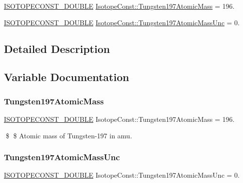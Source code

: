 \begin{DoxyCompactItemize}
\item 
\mbox{\hyperlink{group___isotope_const-_macros_ga8f45a7272ce02c0b4c65c44636ed719a}{I\+S\+O\+T\+O\+P\+E\+C\+O\+N\+S\+T\+\_\+\+D\+O\+U\+B\+LE}} \mbox{\hyperlink{group___isotope_const-_tungsten-_w197_gafe9014cb9fe7d5e310e5858f73d2bbc4}{Isotope\+Const\+::\+Tungsten197\+Atomic\+Mass}} = 196.
\item 
\mbox{\hyperlink{group___isotope_const-_macros_ga8f45a7272ce02c0b4c65c44636ed719a}{I\+S\+O\+T\+O\+P\+E\+C\+O\+N\+S\+T\+\_\+\+D\+O\+U\+B\+LE}} \mbox{\hyperlink{group___isotope_const-_tungsten-_w197_gae0882796b63f579856c661233511a0e5}{Isotope\+Const\+::\+Tungsten197\+Atomic\+Mass\+Unc}} = 0.
\end{DoxyCompactItemize}


\subsection{Detailed Description}


\subsection{Variable Documentation}
\mbox{\label{group___isotope_const-_tungsten-_w197_gafe9014cb9fe7d5e310e5858f73d2bbc4}} 
\subsubsection{\texorpdfstring{Tungsten197\+Atomic\+Mass}{Tungsten197AtomicMass}}
{\footnotesize\ttfamily \mbox{\hyperlink{group___isotope_const-_macros_ga8f45a7272ce02c0b4c65c44636ed719a}{I\+S\+O\+T\+O\+P\+E\+C\+O\+N\+S\+T\+\_\+\+D\+O\+U\+B\+LE}} Isotope\+Const\+::\+Tungsten197\+Atomic\+Mass = 196.}

\$ \$ Atomic mass of Tungsten-\/197 in amu. \mbox{\label{group___isotope_const-_tungsten-_w197_gae0882796b63f579856c661233511a0e5}} 
\subsubsection{\texorpdfstring{Tungsten197\+Atomic\+Mass\+Unc}{Tungsten197AtomicMassUnc}}
{\footnotesize\ttfamily \mbox{\hyperlink{group___isotope_const-_macros_ga8f45a7272ce02c0b4c65c44636ed719a}{I\+S\+O\+T\+O\+P\+E\+C\+O\+N\+S\+T\+\_\+\+D\+O\+U\+B\+LE}} Isotope\+Const\+::\+Tungsten197\+Atomic\+Mass\+Unc = 0.}

